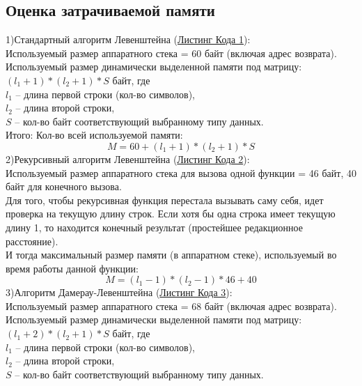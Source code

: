 \documentclass[a4paper,12pt]{article}
\begin{document}
\subsection{Оценка затрачиваемой памяти}
1)Стандартный алгоритм Левенштейна (\hyperref[listings:listing1]{Листинг Кода 1}): \\
Используемый размер аппаратного стека = 60 байт (включая адрес возврата). \\
Используемый размер динамически выделенной памяти под матрицу: \\
$(l_1 + 1) * (l_2 + 1) * S$ байт, где \\
$l_1$ – длина первой строки (кол-во символов), \\
$l_2$ – длина второй строки, \\
$S$ – кол-во байт соответствующий выбранному типу данных. \\
Итого: Кол-во всей используемой памяти:
\begin{equation}
M = 60 + (l_1 + 1) * (l_2 + 1) * S
\end{equation}
2)Рекурсивный алгоритм Левенштейна (\hyperref[listings:listing2]{Листинг Кода 2}): \\
Используемый размер аппаратного стека для вызова одной функции = 46 байт, 40 байт для конечного вызова. \\
Для того, чтобы рекурсивная функция перестала вызывать саму себя, идет проверка на текущую длину строк. Если хотя бы одна строка имеет текущую длину 1, то находится
конечный результат (простейшее редакционное расстояние). \\
И тогда максимальный размер памяти (в аппаратном стеке), используемый во время
работы данной функции:\\
\begin{equation}
M = (l_1 - 1) * (l_2 - 1) * 46 + 40
\end{equation}
3)Алгоритм Дамерау-Левенштейна (\hyperref[listings:listing3]{Листинг Кода 3}): \\
Используемый размер аппаратного стека = 68 байт (включая адрес возврата). \\
Используемый размер динамически выделенной памяти под матрицу: \\
$(l_1 + 2) * (l_2 + 1) * S$ байт, где \\
$l_1$ – длина первой строки (кол-во символов), \\
$l_2$ – длина второй строки, \\
$S$ – кол-во байт соответствующий выбранному типу данных. \\
\end{document}

